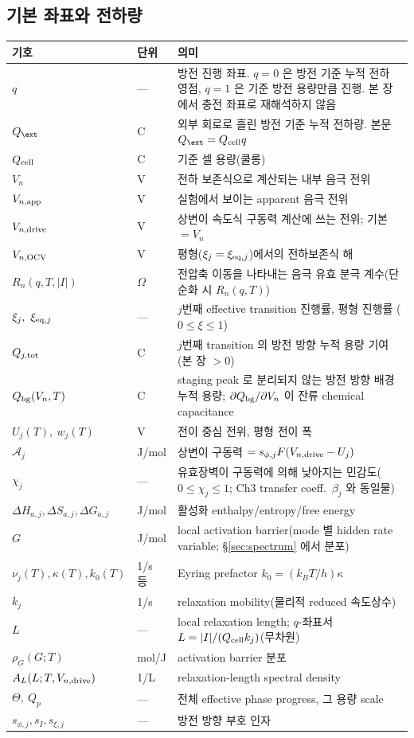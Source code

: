 \subsection{기본 좌표와 전하량}
\begin{longtable}{p{} p{} p{}}
\toprule 기호 & 단위 & 의미 \\ \midrule \endhead
$q$ & --- & 방전 진행 좌표. $q=0$ 은 방전 기준 누적 전하 영점, $q=1$ 은 기준 방전 용량만큼 진행. 본 장에서 충전 좌표로 재해석하지 않음 \\
$Q_\ext$ & C & 외부 회로로 흘린 방전 기준 누적 전하량. 본문 $Q_\ext=Q_\cell q$ \\
$Q_{\mathrm{cell}}$ & C & 기준 셀 용량(쿨롱) \\
$V_n$ & V & 전하 보존식으로 계산되는 내부 음극 전위 \\
$V_{n,\mathrm{app}}$ & V & 실험에서 보이는 apparent 음극 전위 \\
$V_{n,\mathrm{drive}}$ & V & 상변이 속도식 구동력 계산에 쓰는 전위; 기본 $=V_n$ \\
$V_{n,\mathrm{OCV}}$ & V & 평형($\xi_j=\xi_{\mathrm{eq},j}$)에서의 전하보존식 해 \\
$R_n(q,T,|I|)$ & $\Omega$ & 전압축 이동을 나타내는 음극 유효 분극 계수(단순화 시 $R_n(q,T)$) \\
$\xi_j,\ \xi_{\eq,j}$ & --- & $j$번째 effective transition 진행률, 평형 진행률 ($0\!\le\!\xi\!\le\!1$) \\
$Q_{j,\mathrm{tot}}$ & C & $j$번째 transition 의 방전 방향 누적 용량 기여(본 장 $>0$) \\
$Q_{\mathrm{bg}}(V_n,T)$ & C & staging peak 로 분리되지 않는 방전 방향 배경 누적 용량; $\partial Q_{\mathrm{bg}}/\partial V_n$ 이 잔류 chemical capacitance \\
$U_j(T),\ w_j(T)$ & V & 전이 중심 전위, 평형 전이 폭 \\
$\mathcal A_j$ & J/mol & 상변이 구동력 $=s_{\phi,j}F(V_{n,\mathrm{drive}}-U_j)$ \\
$\chi_j$ & --- & 유효장벽이 구동력에 의해 낮아지는 민감도($0\le\chi_j\le1$; Ch3 transfer coeff.\ $\beta_j$ 와 동일물) \\
$\Delta H_{a,j},\Delta S_{a,j},\Delta G_{a,j}$ & J/mol & 활성화 enthalpy/entropy/free energy \\
$G$ & J/mol & local activation barrier(mode 별 hidden rate variable; \S\ref{sec:spectrum} 에서 분포) \\
$\nu_j(T),\kappa(T),k_0(T)$ & 1/s 등 & Eyring prefactor $k_0=(k_BT/h)\kappa$ \\
$k_j$ & 1/s & relaxation mobility(물리적 reduced 속도상수) \\
$L$ & --- & local relaxation length; $q$-좌표서 $L=|I|/(Q_{\mathrm{cell}} k_j)$(무차원) \\
$\rho_G(G;T)$ & mol/J & activation barrier 분포 \\
$A_L(L;T,V_{n,\mathrm{drive}})$ & 1/L & relaxation-length spectral density \\
$\Theta,\ Q_p$ & --- & 전체 effective phase progress, 그 용량 scale \\
$s_{\phi,j},s_I,s_{\xi,j}$ & --- & 방전 방향 부호 인자 \\
\bottomrule
\end{longtable}

